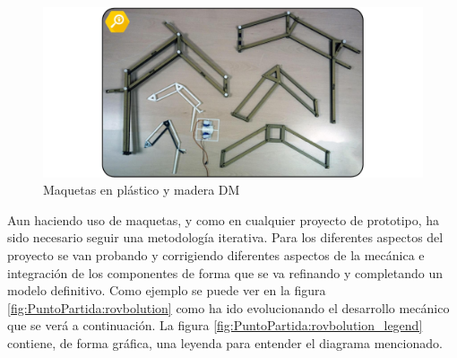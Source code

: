 \begin{figure}[H]
    \centering
    \includegraphics[width=1\textwidth]{figuras/Imagenes_PuntoPartida/maquetas.jpg}
    \caption{Maquetas en plástico y madera DM}
    \label{fig:PuntoPartida:maquetas}
\end{figure}

Aun haciendo uso de maquetas, y como en cualquier proyecto de prototipo, ha sido necesario seguir una metodología iterativa. Para los diferentes aspectos del proyecto se van probando y corrigiendo diferentes aspectos de la mecánica e integración de los componentes de forma que se va refinando y completando un modelo definitivo. Como ejemplo se puede ver en la figura \ref{fig:PuntoPartida:rovbolution} como ha ido evolucionando el desarrollo mecánico que se verá a continuación. La figura \ref{fig:PuntoPartida:rovbolution_legend} contiene, de forma gráfica, una leyenda para entender el diagrama mencionado.
\\


